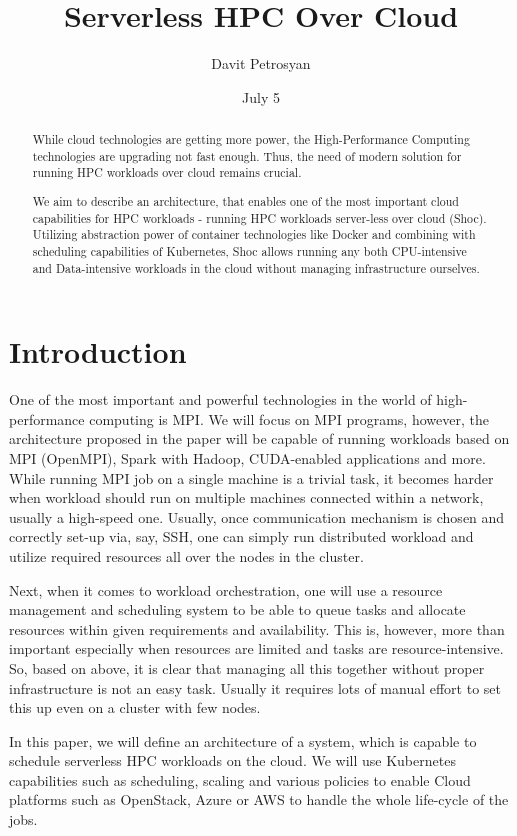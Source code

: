 \documentclass{article}
\title{Serverless HPC Over Cloud}
\author{Davit Petrosyan}
\date{July 5}
\begin{document}
\maketitle

\begin{abstract}
  While cloud technologies are getting more power, the High-Performance Computing technologies are upgrading not fast enough. Thus, the need of modern solution for running HPC workloads over cloud remains crucial. 
  
  We aim to describe an architecture, that enables one of the most important cloud capabilities for HPC workloads - running HPC workloads server-less over cloud (Shoc). Utilizing abstraction power of container technologies like Docker and combining with scheduling capabilities of Kubernetes, Shoc allows running any both CPU-intensive and Data-intensive workloads in the cloud without managing infrastructure ourselves. 
  
\end{abstract}

\section{Introduction}
One of the most important and powerful technologies in the world of high-performance computing is MPI. We will focus on MPI programs, however, the architecture proposed in the paper will be capable of running workloads based on MPI (OpenMPI), Spark with Hadoop, CUDA-enabled applications and more. 
While running MPI job on a single machine is a trivial task, it becomes harder when workload should run on multiple machines connected within a network, usually a high-speed one. Usually, once communication mechanism is chosen and correctly set-up via, say, SSH, one can simply run distributed workload and utilize required resources all over the nodes in the cluster.

Next, when it comes to workload orchestration, one will use a resource management and scheduling system to be able to queue tasks and allocate resources within given requirements and availability. This is, however, more than important especially when resources are limited and tasks are resource-intensive. So, based on above, it is clear that managing all this together without proper infrastructure is not an easy task. Usually it requires lots of manual effort to set this up even on a cluster with few nodes.  

In this paper, we will define an architecture of a system, which is capable to schedule serverless HPC workloads on the cloud. We will use Kubernetes capabilities such as scheduling, scaling and various policies to enable Cloud platforms such as OpenStack, Azure or AWS to handle the whole life-cycle of the jobs.  
\end{document}

